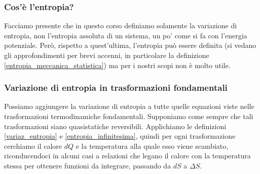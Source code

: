 \subsubsection*{Cos'è l'entropia?}
Facciamo presente che in questo corso definiamo solamente la variazione
di entropia, non l'entropia assoluta di un sistema, un po' come si fa
con l'energia potenziale. Però, rispetto a quest'ultima, l'entropia
può essere definita (si vedano gli approfondimenti per brevi accenni,
in particolare la definizione \ref{entropia_meccanica_statistica}) ma
per i nostri scopi non è molto utile.


\subsubsection*{Variazione di entropia in trasformazioni fondamentali}
Possiamo aggiungere la variazione di entropia a tutte quelle equazioni viste nelle
trasformazioni termodinamiche fondamentali. Supponiamo come sempre
che tali trasformazioni siano quasistatiche reversibili. Applichiamo
le definizioni \ref{variaz_entropia} e \ref{entropia_infinitesima},
quindi per ogni trasformazione cerchiamo il calore $dQ$ e
la temperatura alla quale esso viene scambiato, riconducendoci
in alcuni casi a relazioni che legano il calore con la temperatura
stessa per ottenere funzioni da integrare, passando da $dS$ a $\Delta S$.

